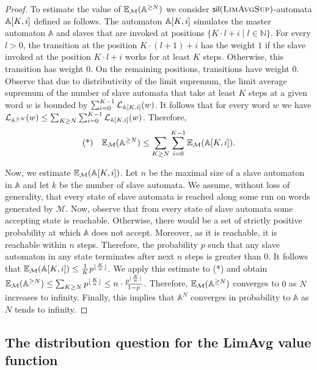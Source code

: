 \documentclass{lmcs}
\newcommand{\nestedA}{\mathbb{A}}
\newcommand{\silent}[1]{\mathsf{sil}({#1})}
\newcommand{\valueL}[1]{\mathcal{L}_{{#1}}}
\newcommand{\N}{\mathbb{N}}
\newcommand{\expected}{\mathbb{E}}
\newcommand{\markov}{\mathcal{M}}
\begin{document}
\begin{proof}
To estimate the value of $\expected_{\markov}(\excessA{N})$ we consider $\silent{\flimavgsup}$-automata $\partialExcessA{K,i}$ defined as follows.
The automaton $\partialExcessA{K,i}$ simulates the master automaton $\nestedA$ and slaves that are invoked at positions $\{ K\cdot l + i \mid l \in \N \}$.
For every $l>0$, the transition at the position $K \cdot (l+1) + i $ has the weight $1$ if the slave invoked at the position $K \cdot l + i$ works for at least $K$ steps.
Otherwise, this transition has weight $0$. On the remaining positions, transitions have weight $0$.
Observe that due to distributivity of the limit supremum, the limit average supremum of the number of slave automata that take at least $K$ steps
at a given word $w$ is bounded by $\sum_{i=0}^{K-1} \valueL{\partialExcessA{K,i}}(w)$. It follows that for every word $w$ we have
$\valueL{\excessA{N}}(w) \leq \sum_{K \geq N} \sum_{i=0}^{K-1} \valueL{\partialExcessA{K,i}}(w)$. Therefore,
\[
\text{(*)}\quad \expected_{\markov}(\excessA{N}) \leq \sum_{K \geq N} \sum_{i=0}^{K-1} \expected_{\markov}(\partialExcessA{K,i}).
\]


Now, we estimate $\expected_{\markov}(\partialExcessA{K,i})$.
Let $n$ be the maximal size of a slave automaton in $\nestedA$ and let $k$ be the number of slave automata.
We assume, without loss of generality, that every state of slave automata is reached along some run on words generated by $\markov$.
Now, observe that from every state of slave automata some accepting state is reachable.
Otherwise, there would be a set of strictly positive probability at which $\nestedA$ does not accept.
Moreover, as it is reachable, it is reachable within $n$ steps.
Therefore,
the probability $p$ such that any slave automaton in any state
terminates after next $n$ steps is greater than $0$.
It follows that $\expected_{\markov}(\partialExcessA{K,i}) \leq \frac{1}{K} p^{\lfloor \frac{K}{n} \rfloor}$.
We apply this estimate to (*) and obtain $\expected_{\markov}(\excessA{N}) \leq \sum_{K \geq N}  p^{\lfloor \frac{K}{n} \rfloor} \leq n \cdot \frac{p^{\lfloor \frac{N}{n} \rfloor }}{1-p}$.
Therefore, $\expected_{\markov}(\excessA{N})$ converges to $0$ as $N$ increases to infinity.
Finally, this implies that
$\nestedA^N$ converges in probability to $\nestedA$ as $N$ tends to infinity.
\end{proof}




\subsection{The distribution question for the LimAvg value function}
\end{document}
